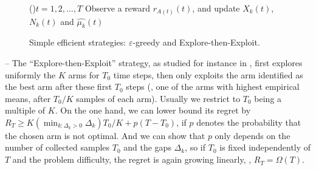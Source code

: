 \begin{figure}[h!]
	\centering
    \begin{framed}
	\begin{algorithm}[H]
		\For(){$t = 1, 2, \dots, T$}{
            Observe a reward $r_{A(t)}(t)$, and update $X_k(t)$, $N_k(t)$ and $\widehat{\mu_k}(t)$
		}
		\caption{Simple efficient strategies: \textcolor{deeppurple}{$\varepsilon$-greedy} and \textcolor{deepgold}{Explore-then-Exploit}.}
		\label{algo:2:naiveStrategies}
	\end{algorithm}
	\end{framed}
\end{figure}


-- The ``\textcolor{deepgold}{Explore-then-Exploit}'' strategy, as studied for instance in \cite{GarivierETC2016}, first explores uniformly the $K$ arms for $T_0$ time steps, then only exploits the arm identified as the best arm after these first $T_0$ steps
(\ie, one of the arms with highest empirical means, after $T_0/K$ samples of each arm).
Usually we restrict to $T_0$ being a multiple of $K$.
On the one hand, we can lower bound its regret by
$R_T \geq K (\min_{k: \Delta_k > 0} \Delta_k) T_0/K + p (T - T_0)$,
if $p$ denotes the probability that the chosen arm is not optimal.
And we can show that $p$ only depends on the number of collected samples $T_0$ and the gaps $\Delta_k$,
so if $T_0$ is fixed independently of $T$ and the problem difficulty, the regret is again growing linearly, \ie, $R_T = \Omega(T)$.

